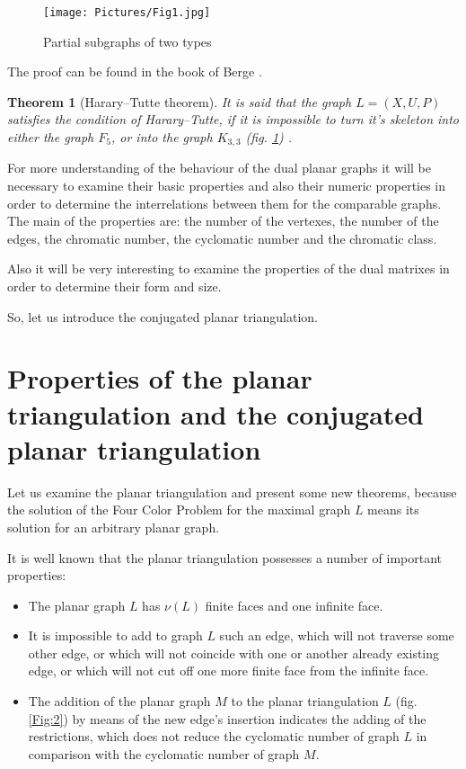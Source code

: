 \documentclass{amsart}
\newtheorem{theorem}{Theorem}
\theoremstyle{plain}
\numberwithin{equation}{section}
\begin{document}
\begin{figure}[htb]
		\texttt{[image: Pictures/Fig1.jpg]}
	\caption{Partial subgraphs of two types}
	\label{Fig:1}
\end{figure}

The proof can be found in the book of Berge \cite {Berge}.

\begin {theorem}[Harary--Tutte theorem]
It is said that the graph $L=(X,U,P)$ satisfies the condition of Harary--Tutte, if it is impossible to turn it's skeleton into either the graph $F_5$, or into the graph $K_{3,3}$ (fig. \ref{Fig:1}) \cite {Harary}.
\end {theorem}

For more understanding of the behaviour of the dual planar graphs it will be necessary to examine their basic properties and also their numeric properties in order to determine the interrelations between them for the comparable graphs. The main of the properties are: the number of the vertexes, the number of the edges, the chromatic number, the cyclomatic number and the chromatic class. 

Also it will be very interesting to examine the properties of the dual matrixes in order to determine their form and size.

So, let us introduce the conjugated planar triangulation. 

\section{Properties of the planar triangulation and the conjugated planar triangulation}

Let us examine the planar triangulation and present some new theorems, because the solution of the Four Color Problem for the maximal graph $L$ means its solution for an arbitrary planar graph. 

It is well known that the planar triangulation possesses a number of important properties:

\begin{itemize}
\item 
The planar graph $L$ has $\nu(L)$ finite faces and one infinite face.
\item 
It is impossible to add to graph $L$ such an edge, which will not traverse some other edge, or which will not coincide with one or another already existing edge, or which will not cut off one more finite face from the infinite face.
\item 
The addition of the planar graph $M$ to the planar triangulation $L$ (fig. \ref{Fig:2}) by means of the new edge's insertion indicates the adding of the restrictions, which does not reduce the cyclomatic number of graph $L$ in comparison with the cyclomatic number of graph $M$.
\end{itemize}
\end{document}
